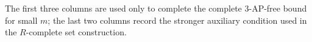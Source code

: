 \documentclass[11pt]{article}
\begin{document}
	
	The first three columns are used only to complete the  complete $3$-AP-free bound for small $m$; the last two columns record the stronger auxiliary condition used in the $R$-complete  set construction.
	
	
\end{document}
